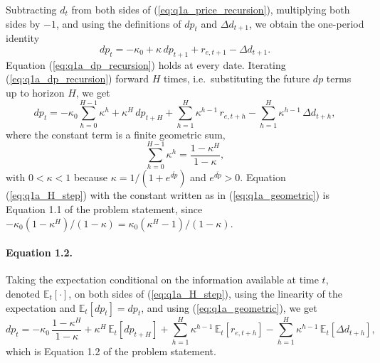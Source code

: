 \documentclass[11pt]{article}
\newcommand{\E}{\mathbb{E}}
\newcommand{\dpr}{\mathit{dp}}   %
\begin{document}
Subtracting $d_t$ from both sides of (\ref{eq:q1a_price_recursion}), multiplying both sides
by $-1$, and using the definitions of $\dpr_t$ and $\Delta d_{t+1}$, we obtain the
one-period identity
\begin{equation}
  \dpr_t = -\kappa_0 + \kappa\, \dpr_{t+1} + r_{e,t+1} - \Delta d_{t+1}.
  \label{eq:q1a_dp_recursion}
\end{equation}
Equation (\ref{eq:q1a_dp_recursion}) holds at every date. Iterating
(\ref{eq:q1a_dp_recursion}) forward $H$ times, i.e.\ substituting the future $\dpr$ terms
up to horizon $H$, we get
\begin{equation}
  \dpr_t = -\kappa_0 \sum_{h=0}^{H-1} \kappa^{h}
           + \kappa^{H}\, \dpr_{t+H}
           + \sum_{h=1}^{H} \kappa^{h-1}\, r_{e,t+h}
           - \sum_{h=1}^{H} \kappa^{h-1}\, \Delta d_{t+h},
  \label{eq:q1a_H_step}
\end{equation}
where the constant term is a finite geometric sum,
\begin{equation}
  \sum_{h=0}^{H-1} \kappa^{h} = \frac{1 - \kappa^{H}}{1 - \kappa},
  \label{eq:q1a_geometric}
\end{equation}
with $0 < \kappa < 1$ because $\kappa = 1/(1 + e^{\overline{\dpr}})$ and
$e^{\overline{\dpr}} > 0$. Equation (\ref{eq:q1a_H_step}) with the constant written as in
(\ref{eq:q1a_geometric}) is Equation 1.1 of the problem statement, since
$-\kappa_0 (1 - \kappa^{H})/(1 - \kappa) = \kappa_0 (\kappa^{H} - 1)/(1 - \kappa)$.

\paragraph{Equation 1.2.}
Taking the expectation conditional on the information available at time $t$, denoted
$\E_t[\cdot]$, on both sides of (\ref{eq:q1a_H_step}), using the linearity of the
expectation and $\E_t[\dpr_t] = \dpr_t$, and using (\ref{eq:q1a_geometric}), we get
\begin{equation}
  \dpr_t = -\kappa_0\, \frac{1 - \kappa^{H}}{1 - \kappa}
           + \kappa^{H}\, \E_t[\dpr_{t+H}]
           + \sum_{h=1}^{H} \kappa^{h-1}\, \E_t[r_{e,t+h}]
           - \sum_{h=1}^{H} \kappa^{h-1}\, \E_t[\Delta d_{t+h}],
  \label{eq:q1a_expectation}
\end{equation}
which is Equation 1.2 of the problem statement.
\end{document}
